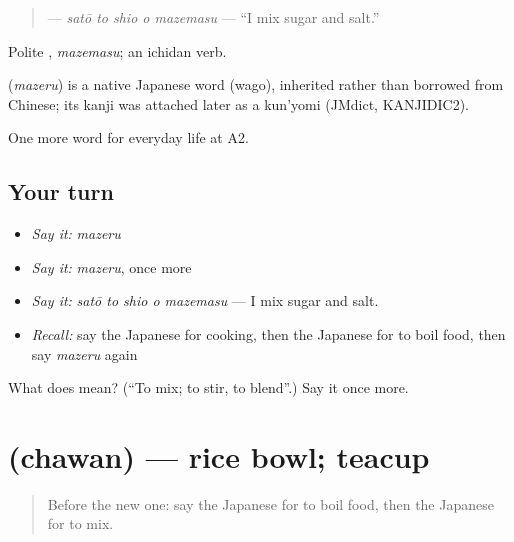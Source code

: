 \begin{quote}
\textbf{  } — \emph{satō to shio o mazemasu} — \textquotedblleft{}I mix sugar and salt.\textquotedblright{}
\end{quote}

Polite \textbf{}, \emph{mazemasu}; an ichidan verb.

\begin{cousinweb}
\textbf{} (\emph{mazeru}) is a native Japanese word (wago), inherited rather than borrowed from Chinese; its kanji was attached later as a kun'yomi (JMdict, KANJIDIC2).
\end{cousinweb}

\begin{grammarlens}[title={What you've built}]
One more word for everyday life at A2.
\end{grammarlens}

\subsection*{Your turn}
\begin{itemize}
\raggedright
  \item \emph{Say it:} \emph{mazeru}
  \item \emph{Say it:} \emph{mazeru}, once more
  \item \emph{Say it:} \emph{satō to shio o mazemasu} — I mix sugar and salt.
  \item \emph{Recall:} say the Japanese for cooking, then the Japanese for to boil food, then say \emph{mazeru} again
\end{itemize}

\begin{tcolorbox}[breakable,colback=teal!4,colframe=teal!35!black,title={Before you move on}]
What does  mean? (\textquotedblleft{}To mix; to stir, to blend\textquotedblright{}.) Say it once more.
\end{tcolorbox}
\section[\texorpdfstring{\ja{ちゃわん} (chawan)}{ちゃわん (chawan)}]{ (chawan) — rice bowl; teacup}

\label{lesson:JA-C175-chawan}



\begin{quote}
Before the new one: say the Japanese for to boil food, then the Japanese for to mix.
\end{quote}

